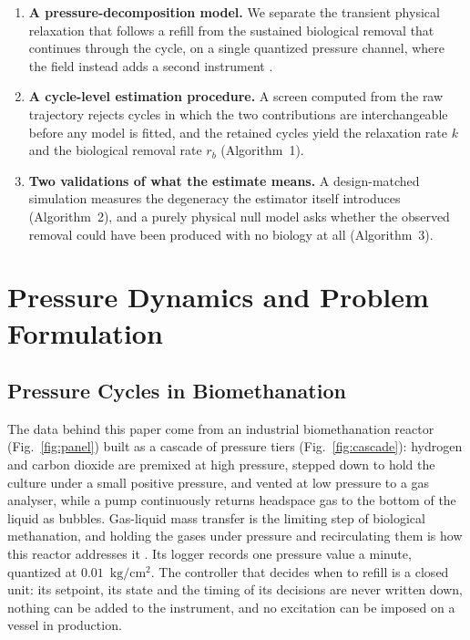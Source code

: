 \documentclass[runningheads]{llncs}
\newcommand{\pu}{\ensuremath{\mathrm{kg/cm^{2}}}}
\newcommand{\rb}{\ensuremath{r_{b}}}
\begin{document}
\begin{enumerate}
\item \textbf{A pressure-decomposition model.} We separate the
transient physical relaxation that follows a refill from the sustained
biological removal that continues through the cycle, on a single
quantized pressure channel, where the field instead adds a second
instrument \cite{hafner2018quantification}.
\item \textbf{A cycle-level estimation procedure.} A screen computed
from the raw trajectory rejects cycles in which the two contributions
are interchangeable before any model is fitted, and the retained cycles
yield the relaxation rate $k$ and the biological removal rate \rb{}
(Algorithm~1).
\item \textbf{Two validations of what the estimate means.} A
design-matched simulation measures the degeneracy the estimator itself
introduces (Algorithm~2), and a purely physical null model asks whether
the observed removal could have been produced with no biology at all
(Algorithm~3).
\end{enumerate}

\section{Pressure Dynamics and Problem Formulation}
\label{sec:dynamics}

\subsection{Pressure Cycles in Biomethanation}

The data behind this paper come from an industrial biomethanation
reactor (Fig.~\ref{fig:panel}) built as a cascade of pressure
tiers (Fig.~\ref{fig:cascade}):
hydrogen and carbon dioxide are premixed at high pressure, stepped down
to hold the culture under a small positive pressure, and vented at low
pressure to a gas analyser, while a pump continuously returns headspace
gas to the bottom of the liquid as bubbles. Gas-liquid mass transfer is
the limiting step of biological methanation, and holding the gases
under pressure and recirculating them is how this reactor addresses it
\cite{yoruklu2025comprehensive}. Its logger records one pressure value
a minute, quantized at $0.01$~\pu{}. The controller that decides when
to refill is a closed unit: its setpoint, its state and the timing of
its decisions are never written down, nothing can be added to the
instrument, and no excitation can be imposed on a vessel in production.
\end{document}
